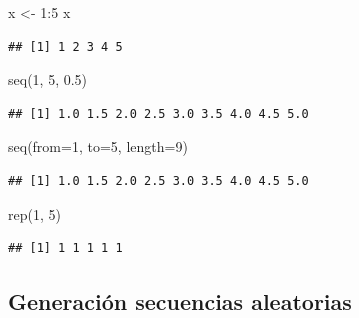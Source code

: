\documentclass[
]{book}
\newenvironment{Shaded}{\begin{snugshade}}{\end{snugshade}}
\newcommand{\AttributeTok}[1]{\textcolor[rgb]{0.77,0.63,0.00}{#1}}
\newcommand{\DecValTok}[1]{\textcolor[rgb]{0.00,0.00,0.81}{#1}}
\newcommand{\FloatTok}[1]{\textcolor[rgb]{0.00,0.00,0.81}{#1}}
\newcommand{\FunctionTok}[1]{\textcolor[rgb]{0.00,0.00,0.00}{#1}}
\newcommand{\NormalTok}[1]{#1}
\newcommand{\OtherTok}[1]{\textcolor[rgb]{0.56,0.35,0.01}{#1}}
\newcommand{\SpecialCharTok}[1]{\textcolor[rgb]{0.00,0.00,0.00}{#1}}
\theoremstyle{break}
\begin{document}
\begin{Shaded}
\begin{Highlighting}[]
\NormalTok{x }\OtherTok{\textless{}{-}} \DecValTok{1}\SpecialCharTok{:}\DecValTok{5}
\NormalTok{x}
\end{Highlighting}
\end{Shaded}

\begin{verbatim}
## [1] 1 2 3 4 5
\end{verbatim}

\begin{Shaded}
\begin{Highlighting}[]
\FunctionTok{seq}\NormalTok{(}\DecValTok{1}\NormalTok{, }\DecValTok{5}\NormalTok{, }\FloatTok{0.5}\NormalTok{)}
\end{Highlighting}
\end{Shaded}

\begin{verbatim}
## [1] 1.0 1.5 2.0 2.5 3.0 3.5 4.0 4.5 5.0
\end{verbatim}

\begin{Shaded}
\begin{Highlighting}[]
\FunctionTok{seq}\NormalTok{(}\AttributeTok{from=}\DecValTok{1}\NormalTok{, }\AttributeTok{to=}\DecValTok{5}\NormalTok{, }\AttributeTok{length=}\DecValTok{9}\NormalTok{)}
\end{Highlighting}
\end{Shaded}

\begin{verbatim}
## [1] 1.0 1.5 2.0 2.5 3.0 3.5 4.0 4.5 5.0
\end{verbatim}

\begin{Shaded}
\begin{Highlighting}[]
\FunctionTok{rep}\NormalTok{(}\DecValTok{1}\NormalTok{, }\DecValTok{5}\NormalTok{)}
\end{Highlighting}
\end{Shaded}

\begin{verbatim}
## [1] 1 1 1 1 1
\end{verbatim}

\hypertarget{generaciuxf3n-secuencias-aleatorias}{%
\subsection{Generación secuencias aleatorias}\label{generaciuxf3n-secuencias-aleatorias}}
\end{document}
